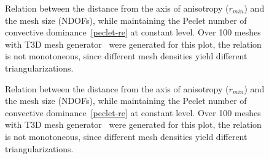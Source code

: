 \documentclass[review,times,3p,10pt]{elsarticle}
\begin{document}
 \begin{figure}
\centering
{}
 \caption{Relation between the distance from the axis of anisotropy ($r_{min}$) and the mesh size (NDOFs), while maintaining the Peclet number of convective dominance~\eqref{peclet-re} at constant level. Over 100 meshes with T3D mesh generator~\cite{t3d} were generated for this plot, the relation is not monotoneous, since different mesh densities yield different triangularizations.}
 \label{mesh-dens}
\end{figure}


 \begin{figure}
\centering
{}
 \caption{Relation between the distance from the axis of anisotropy ($r_{min}$) and the mesh size (NDOFs), while maintaining the Peclet number of convective dominance~\eqref{peclet-re} at constant level. Over 100 meshes with T3D mesh generator~\cite{t3d} were generated for this plot, the relation is not monotoneous, since different mesh densities yield different triangularizations.}
 \label{mesh-evals2}
\end{figure}
\end{document}
